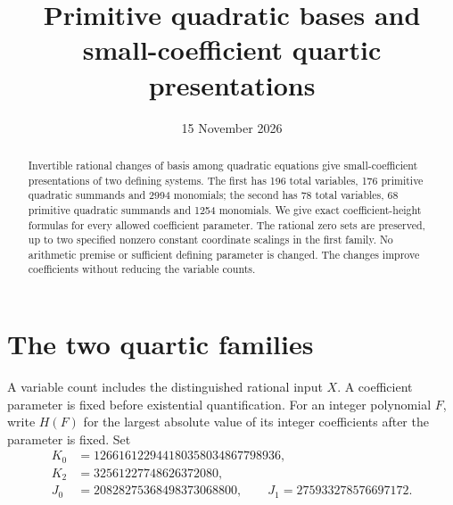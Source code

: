 \documentclass[11pt,a4paper]{article}
\title{Primitive quadratic bases and small-coefficient quartic presentations}
\author{}\date{15 November 2026}
\begin{document}
\maketitle
\begin{abstract}
Invertible rational changes of basis among quadratic equations give
small-coefficient presentations of two defining systems. The first has
196 total variables, 176 primitive quadratic summands and 2994 monomials;
the second has 78 total variables, 68 primitive quadratic summands and
1254 monomials. We give exact coefficient-height formulas for every allowed
coefficient parameter. The rational zero sets are preserved, up to two
specified nonzero constant coordinate scalings in the first family.
No arithmetic premise or sufficient defining parameter is changed.
The changes improve coefficients without reducing the variable counts.
\end{abstract}

\section{The two quartic families}
A variable count includes the distinguished rational input $X$.
A coefficient parameter is fixed before existential quantification.
For an integer polynomial $F$, write $H(F)$ for the largest absolute
value of its integer coefficients after the parameter is fixed.
Set
\begin{align*}
 K_0&=126616122944180358034867798936,\\
 K_2&=32561227748626372080,\\
 J_0&=20828275368498373068800,\qquad
 J_1=275933278576697172.
\end{align*}
\end{document}
